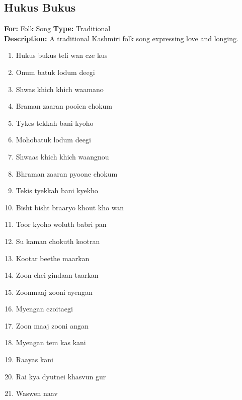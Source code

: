\documentclass[12pt]{article}
\newcommand{\bigroman}[1]{\fontsize{16pt}{18pt}\selectfont\RaggedRight #1}
\begin{document}
\subsection*{Hukus Bukus}
\textbf{For:} Folk Song \quad \textbf{Type:} Traditional\\
\textbf{Description:} A traditional Kashmiri folk song expressing love and longing.

\begin{multicols}{2}
\begin{enumerate}[leftmargin=*, label=\arabic*., font=\fontsize{16pt}{18pt}\selectfont]
  \item \bigroman{Hukus bukus teli wan cze kus}
  \item \bigroman{Onum batuk lodum deegi}
  \item \bigroman{Shwas khich khich waamano}
  \item \bigroman{Braman zaaran pooien chokum}
  \item \bigroman{Tykes tekkah bani kyoho}
  \item \bigroman{Mohobatuk lodum deegi}
  \item \bigroman{Shwaas khich khich waangnou}
  \item \bigroman{Bhraman zaaran pyoone chokum}
  \item \bigroman{Tekis tyekkah bani kyekho}
  \item \bigroman{Bisht bisht braaryo khout kho wan}
  \item \bigroman{Toor kyoho woluth babri pan}
  \item \bigroman{Su kaman chokuth kootran}
  \item \bigroman{Kootar beethe maarkan}
  \item \bigroman{Zoon chei gindaan taarkan}
  \item \bigroman{Zoonmaaj zooni ayengan}
  \item \bigroman{Myengan czoitaegi}
  \item \bigroman{Zoon maaj zooni angan}
  \item \bigroman{Myengan tem kas kani}
  \item \bigroman{Raayas kani}
  \item \bigroman{Rai kya dyutnei khasvun gur}
  \item \bigroman{Waswen naav}
\end{enumerate}

\columnbreak


\end{multicols}
\end{document}
